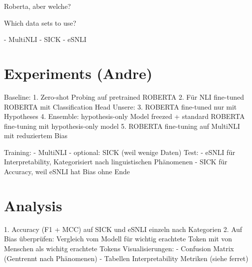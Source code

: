 \documentclass[12pt,a4paper]{article}
\begin{document}
Roberta, aber welche?

Which data sets to use?

- MultiNLI
- SICK
- eSNLI

\section{Experiments (Andre)}
Baseline:
1. Zero-shot Probing auf pretrained ROBERTA
2. Für NLI fine-tuned ROBERTA mit Classification Head
Unsere:
3. ROBERTA fine-tuned nur mit Hypotheses
4. Ensemble: hypothesis-only Model freezed + standard ROBERTA fine-tuning mit hypothesis-only model
5. ROBERTA fine-tuning auf MultiNLI mit reduziertem Bias

Training:
- MultiNLI
- optional: SICK (weil wenige Daten)
Test:
- eSNLI für Interpretability, Kategorisiert nach linguistischen Phänomenen
- SICK für Accuracy, weil eSNLI hat Bias ohne Ende

\section{Analysis}
1. Accuracy (F1 + MCC) auf SICK und eSNLI einzeln nach Kategorien
2. Auf Bias überprüfen: Vergleich vom Modell für wichtig erachtete Token mit von Menschen als wichitg erachtete Tokens
Visualisierungen:
- Confusion Matrix (Gentrennt nach Phänomenen)
- Tabellen Interpretability Metriken (siehe ferret)


\printbibliography
\end{document}
